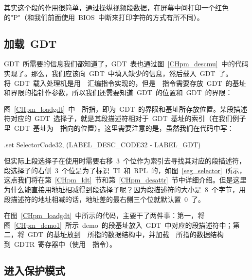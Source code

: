 \label{CHpm_demo1}

其实这个段的作用很简单，通过操纵视频段数据，在屏幕中间打印一个红色的"P"（和我们前面使用~BIOS~中断来打印字符的方式有所不同）。

\subsection{加载~GDT} \label{CHpm_secloadgdt}

GDT~所需要的信息我们都知道了，GDT~表也通过图~\ref{CHpm_descmu}~中的代码实现了。那么，我们应该向~GDT~中填入缺少的信息，然后载入~GDT~了。将~GDT~载入处理机是用~~汇编指令实现的，但是~~指令需要存放~GDT~的基址和界限的指针作参数，所以我们还需要知道~GDT~的位置和~GDT~的界限：

\label{CHpm_loadgdt}

图~\ref{CHpm_loadgdt}~中~~所指，即为~GDT~的界限和基址所存放位置。某段描述符对应的~GDT~选择子，就是其段描述符相对于~GDT~基址的索引（在我们例子里~GDT~基址为~~指向的位置）。这里需要注意的是，虽然我们在代码中写：

\begin{Command}
.set SelectorCode32, (LABEL_DESC_CODE32 - LABEL_GDT)
\end{Command}
但实际上段选择子在使用时需要右移~3~个位作为索引去寻找其对应的段描述符，段选择子的右侧~3~个位是为了标识~TI~和~RPL~的，如图~\ref{seg_selector}~所示，这点我们将在第~\ref{CHpm_ldt}~节和第~\ref{CHpm_desattr}~节中详细介绍。但是这里为什么能直接用地址相减得到段选择子呢？因为段描述符的大小是~8~个字节，用段描述符的地址相减的话，地址差的最右侧三个位就默认置~0~了。

在图~\ref{CHpm_loadgdt}~中所示的代码，主要干了两件事：第一，将图~\ref{CHpm_demo1}~所示~demo~的段基址放入~GDT~中对应的段描述符中；第二，将~GDT~的基址放到~~所指的数据结构中，并加载~~所指的数据结构到~GDTR~寄存器中（使用~~指令）。

\subsection{进入保护模式}

